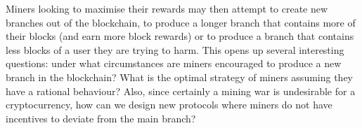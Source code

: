 Miners looking to maximise their rewards may then attempt to create new branches out of the blockchain, to produce a longer branch that contains more of their blocks (and earn more block rewards) or to produce a branch that contains less blocks of a user they are trying to harm. This opens up several interesting questions: under what circumstances are miners 
encouraged to produce a new branch in the blockchain? What is the optimal strategy of miners assuming they have a rational behaviour? Also, since certainly a mining war is undesirable for a cryptocurrency, how can we design new protocols where miners do not have incentives to deviate from the main branch? 



